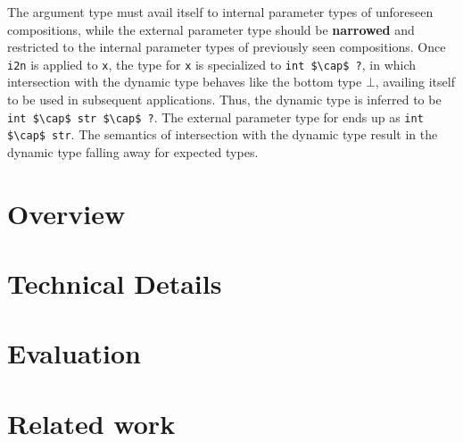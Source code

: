 \documentclass[sigplan,screen]{acmart}
\begin{document}
The argument type must avail itself to internal parameter types of unforeseen compositions,
while the external parameter type should be \textbf{narrowed} and restricted 
to the internal parameter types of previously seen compositions.
Once \lstinline{i2n} is applied to \lstinline{x}, 
the type for \lstinline{x} is specialized to \lstinline{int $\cap$ ?}, 
in which intersection with the dynamic type behaves like the bottom type $\bot$,
availing itself to be used in subsequent applications. 
Thus, the dynamic type is inferred to be \lstinline{int $\cap$ str $\cap$ ?}.
The external parameter type for ends up as \lstinline{int $\cap$ str}. 
The semantics of intersection with the dynamic type result in the dynamic type
falling away for expected types.

\section{Overview}

\section{Technical Details}

\section{Evaluation}

\section{Related work}

\end{document}
